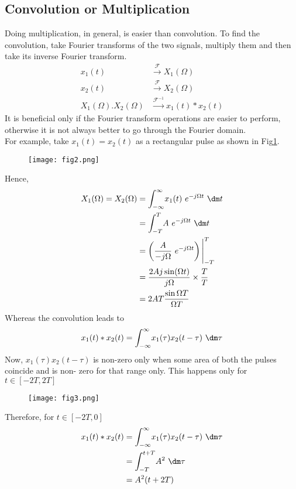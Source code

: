 \subsection{Convolution or Multiplication}
	Doing multiplication, in general, is easier than convolution. To find the convolution, take Fourier transforms of the two signals, multiply them and then take its inverse Fourier transform.
	\begin{align}
		x_1(t) &\xrightarrow{\mathcal{F}} X_1(\Omega)\\
		x_2(t) &\xrightarrow{\mathcal{F}} X_2(\Omega)\\
		X_1(\Omega).X_2(\Omega) &\xrightarrow{\mathcal{F}^{-1}} x_1(t) \ast x_2(t)
	\end{align}
	It is beneficial only if the Fourier transform operations are easier to perform, otherwise it is not always better to go through the Fourier domain.\\
	For example, take $x_1(t)=x_2(t)$ as a rectangular pulse as shown in Fig\ref{fig:rectangular_pulse}.
	\begin{figure}[h!]\label{fig:rectangular_pulse}
		\centering
		\texttt{[image: fig2.png]}
	\end{figure}
	Hence,
	\begin{align}
		X_1(\Omega)=X_2(\Omega) &= \int_{-\infty}^{\infty} \! x_1(t) \ e^{-j\Omega t} \ \dm t\\
		&= \int_{-T}^{T} \! A \ e^{-j\Omega t} \ \dm t\\
		&= \left(\frac{A}{-j\Omega} \ e^{-j\Omega t}\right) \Bigg|_{-T}^{T}\\
		&= \frac{2Aj \sin(\Omega t)}{j\Omega} \times \frac{T}{T}\\
		&= 2AT \frac{\sin{\Omega T}}{\Omega T}
	\end{align}
	Whereas the convolution leads to
	\begin{equation}
		x_1(t) \ast x_2(t)=\int_{-\infty}^{\infty} \! x_1(\tau)x_2(t-\tau) \ \dm \tau
	\end{equation}
	Now, $x_1(\tau) x_2(t-\tau)$ is non-zero only when some area of both the pulses coincide and is non- zero for that range only.
	This happens only for $t \in [-2T,2T]$
	\begin{figure}[h!]
	\centering
	\texttt{[image: fig3.png]}
	\end{figure}
	Therefore, for $t \in [-2T,0]$
	\begin{align}
		x_1(t) \ast x_2(t) &= \int_{-\infty}^{\infty} \! x_1(\tau)x_2(t-\tau) \ \dm \tau\\
		&= \int_{-T}^{t+T} \! A^2 \ \dm \tau \\
		&= A^2 (t+2T)
	\end{align}
